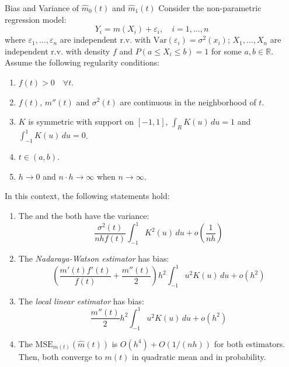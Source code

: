\begin{theorem}{Bias and Variance of $\hat m_0(t)$ and $\hat m_1(t)$}{}
	Consider the non-parametric regression model:
	\begin{equation*}
		Y_i = m(X_i) + \varepsilon_i, \quad i = 1, \ldots, n
	\end{equation*}
	where $\varepsilon_1, \ldots, \varepsilon_n$ are independent r.v. with
	$\text{Var}(\varepsilon_i) = \sigma^2(x_i)$; $X_1, \ldots, X_n$ are
	independent r.v. with density $f$ and $P(a \leq X_i \leq b) = 1$ for some
	$a, b \in \mathbb R$. Assume the following regularity conditions:
	\begin{enumerate}
		\item $f(t) > 0\quad\forall t$.
		\item $f(t),\, m''(t)$ and $\sigma^2(t)$ are continuous in the neighborhood of $t$.
		\item $K$ is symmetric with support on $[-1, 1]$, $\int_R K(u) \, du = 1$ and
		      $\int_{-1}^1 K(u) \, du = 0$.
		\item $t \in (a, b)$.
		\item $h \to 0$ and $n\cdot h \to \infty$ when $n \to \infty$.
	\end{enumerate}
	\tcbline
	In this context, the following statements hold:
	\begin{enumerate}
		\item The  and the 
		      both have the variance:
		      \begin{equation*}
			      \frac{\sigma^2(t)}{nhf(t)} \int_{-1}^1 K^2(u) \, du + o\left(\frac{1}{nh}\right)
		      \end{equation*}
		\item The \emph{Nadaraya-Watson estimator} has bias:
		      \begin{equation*}
			      \left(
			      \frac{m'(t)f'(t)}{f(t)} + \frac{m''(t)}{2}
			      \right)h^2
			      \int_{-1}^1 u^2K(u) \, du + o\left(h^2\right)
		      \end{equation*}
		\item The \emph{local linear estimator} has bias:
		      \begin{equation*}
			      \frac{m''(t)}{2} h^2
			      \int_{-1}^1 u^2K(u) \, du + o\left(h^2\right)
		      \end{equation*}
		\item The $\text{MSE}_{m(t)}(\hat m(t))$ is $O(h^4) + O(1/(nh))$ for both estimators.
		      Then, both converge to $m(t)$ in quadratic mean and in probability.
	\end{enumerate}
\end{theorem}

